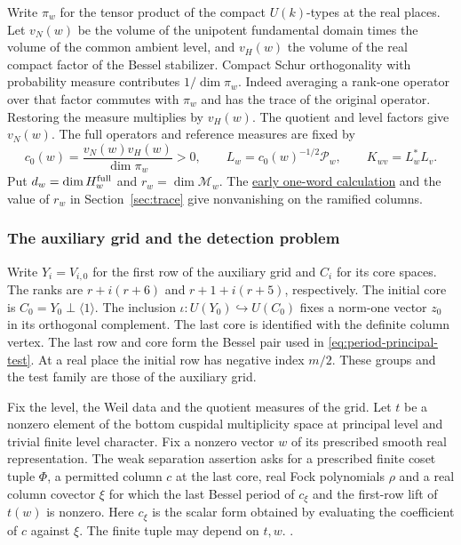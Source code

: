Write \(\pi_w\) for the tensor product of the compact \(U(k)\)-types
at the real places. Let \(v_N(w)\) be the volume of the unipotent
fundamental domain times the volume of the common ambient level, and
\(v_H(w)\) the volume of the real compact factor of the Bessel
stabilizer. Compact Schur orthogonality with probability measure
contributes \(1/\dim\pi_w\). Indeed averaging a rank-one operator
over that factor commutes with \(\pi_w\) and has the trace of the
original operator. Restoring the measure multiplies by \(v_H(w)\).
The quotient and level factors give \(v_N(w)\). The full operators
and reference measures are fixed by
\begin{equation}
\label{eq:period-gram}
 c_0(w)=\frac{v_N(w)v_H(w)}{\dim\pi_w}>0,\qquad
 L_w=c_0(w)^{-1/2}\mathcal P_w,\qquad
 K_{wv}=L_w^*L_v .
\end{equation}
Put \(d_w=\dim H_w^{\rm full}\) and \(r_w=\dim\mathcal M_w\). The
\hyperlink{proof.nonzero-anchor}{early one-word calculation} and
the value of \(r_w\) in Section~\ref{sec:trace} give nonvanishing on
the ramified columns.

%
\subsubsection{The auxiliary grid and the detection problem}
Write \(Y_i=V_{i,0}\) for the first row of the auxiliary grid and
\(C_i\) for its core spaces. The ranks are \(r+i(r+6)\) and
\(r+1+i(r+5)\), respectively. The initial core is
\(C_0=Y_0\perp\langle1\rangle\). The inclusion
\(\iota:U(Y_0)\hookrightarrow U(C_0)\) fixes a norm-one vector \(z_0\)
in its orthogonal complement. The last core is identified with the
definite column vertex. The last row and core form the Bessel pair
used in \eqref{eq:period-principal-test}. At a real place the initial
row has negative index \(m/2\). These groups and the test family
are those of the auxiliary grid.

Fix the level, the Weil data and the quotient measures of the grid.
Let \(t\) be a nonzero element of the bottom cuspidal multiplicity
space at principal level and trivial finite level character.
Fix a nonzero vector \(w\) of its prescribed smooth real
representation. The weak separation assertion asks for a prescribed
finite coset tuple \(\Phi\), a permitted column \(c\) at the last
core, real Fock polynomials \(\rho\) and a real column covector
\(\xi\) for which the last Bessel period of
\(c_\xi\) and the first-row lift of \(t(w)\) is nonzero. Here \(c_\xi\)
is the scalar form obtained by evaluating the coefficient of \(c\)
against \(\xi\). The finite tuple may depend on \(t,w\).
.

